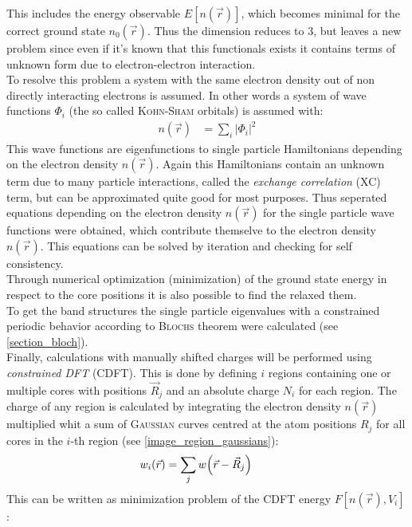 This includes the energy observable $E[n\left(\vec{r}\right)]$, which becomes minimal for the correct ground state $n_0\left(\vec{r}\right)$. Thus the dimension reduces to $3$, but leaves a new problem since even if it's known that this functionals exists it contains terms of unknown form due to electron-electron interaction.\\
To resolve this problem a system with the same electron density out of non directly interacting electrons is assumed. In other words a system of wave functions $\varPhi_i$ (the so called \textsc{Kohn-Sham} orbitals) is assumed with:
\begin{align}
n\left(\vec{r}\right) &= \sum_i \left|\varPhi_i\right|^2
\end{align}
This wave functions are eigenfunctions to single particle Hamiltonians depending on the electron density $n(\vec{r})$. Again this Hamiltonians contain an unknown term due to many particle interactions, called the \emph{exchange correlation} (XC) term, but can be approximated quite good for most purposes. Thus seperated equations depending on the electron density $n\left(\vec{r}\right)$ for the single particle wave functions were obtained, which contribute themselve to the electron density $n\left(\vec{r}\right)$. This equations can be solved by iteration and checking for self consistency.\\
Through numerical optimization (minimization) of the ground state energy in respect to the core positions it is also possible to find the relaxed them.\\
To get the band structures the single particle eigenvalues with a constrained periodic behavior according to \textsc{Blochs} theorem were calculated (see \cref{section_bloch}).\\
Finally, calculations with manually shifted charges will be performed using \emph{constrained DFT} (CDFT). This is done by defining $i$ regions containing one or multiple cores with positions $\vec{R}_j$ and an absolute charge $N_i$ for each region. The charge of any region is calculated by integrating the electron density $n\left(\vec{r}\right)$ multiplied whit a sum of \textsc{Gaussian} curves centred at the atom positions $R_j$ for all cores in the $i$-th region (see \cref{image_region_gaussians}):
\begin{align}
w_i\left(\vec{r}\right) &= \sum_j w\left(\vec{r} - \vec{R}_j\right) \text{\quad}
\end{align}
This can be written as minimization problem of the CDFT energy $F[n\left(\vec{r}\right), V_i]$:
